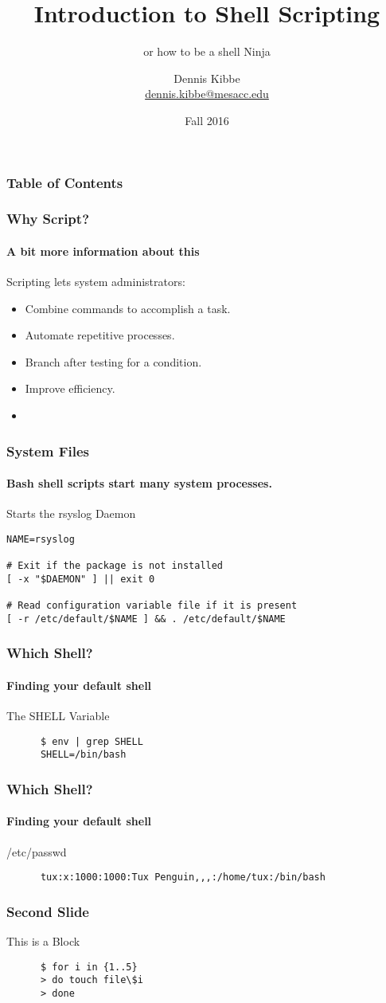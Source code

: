 \documentclass[12pt,handout,aspectratio=169]{beamer}
\title{Introduction to Shell Scripting}
\subtitle{or how to be a shell Ninja}
\author{Dennis Kibbe \\\href{mailto:dennis.kibbe@mesacc.edu}{dennis.kibbe@mesacc.edu}}
\institute{Mesa Community College \\Network Academy}
\date{Fall 2016}
\begin{document}
\maketitle
\begin{frame}
\frametitle{Table of Contents}
\tableofcontents[currentsection]
\end{frame}
\begin{frame}
  \frametitle{Why Script?}
  \framesubtitle{A bit more information about this}
  Scripting lets system administrators:
  \begin{itemize}
  \item Combine commands to accomplish a task.
    \pause
  \item Automate repetitive processes.
    \pause
  \item Branch after testing for a condition.
    \pause
  \item Improve efficiency.
    \pause
  \item
    \pause
  \end{itemize}
\end{frame}
\begin{frame}[fragile]
  \frametitle{System Files}
  \framesubtitle{Bash shell scripts start many system processes.}
  \begin{block}{Starts the rsyslog Daemon}
    \begin{verbatim}
NAME=rsyslog

# Exit if the package is not installed
[ -x "$DAEMON" ] || exit 0

# Read configuration variable file if it is present
[ -r /etc/default/$NAME ] && . /etc/default/$NAME
\end{verbatim}
\end{block}
\end{frame}
\begin{frame}[fragile]
  \frametitle{Which Shell?}
  \framesubtitle{Finding your default shell}
  \begin{block}{The SHELL Variable}
    \begin{verbatim}
      $ env | grep SHELL
      SHELL=/bin/bash
    \end{verbatim}
  \end{block}
\end{frame}
\begin{frame}[fragile]
  \frametitle{Which Shell?}
  \framesubtitle{Finding your default shell}
  \begin{block}{/etc/passwd}
    \begin{verbatim}
      tux:x:1000:1000:Tux Penguin,,,:/home/tux:/bin/bash
    \end{verbatim}
  \end{block}
\end{frame}
\begin{frame}[fragile]
  \frametitle{Second Slide}
   \begin{block}{This is a Block}
    \begin{verbatim}
      $ for i in {1..5}
      > do touch file\$i
      > done
    \end{verbatim}
   \end{block}
\end{frame}
\end{document}
